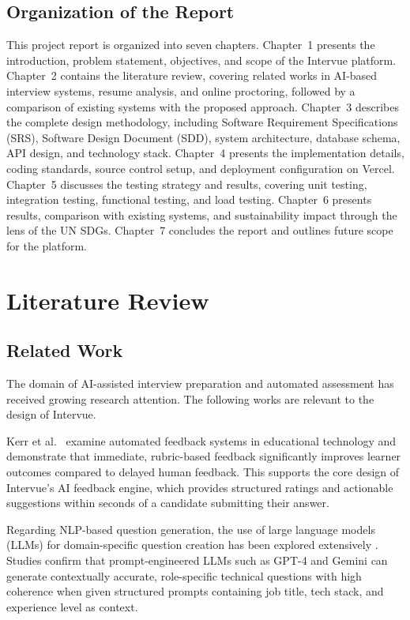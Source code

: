 \documentclass{fisatprojectfinal}
\begin{document}
\section{Organization of the Report}
This project report is organized into seven chapters. Chapter~1 presents the introduction,
problem statement, objectives, and scope of the Intervue platform. Chapter~2 contains the
literature review, covering related works in AI-based interview systems, resume analysis,
and online proctoring, followed by a comparison of existing systems with the proposed
approach. Chapter~3 describes the complete design methodology, including Software Requirement
Specifications (SRS), Software Design Document (SDD), system architecture, database schema,
API design, and technology stack. Chapter~4 presents the implementation details, coding
standards, source control setup, and deployment configuration on Vercel. Chapter~5 discusses
the testing strategy and results, covering unit testing, integration testing, functional
testing, and load testing. Chapter~6 presents results, comparison with existing systems, and
sustainability impact through the lens of the UN SDGs. Chapter~7 concludes the report and
outlines future scope for the platform.

\chapter{Literature Review}

\section{Related Work}
The domain of AI-assisted interview preparation and automated assessment has received growing
research attention. The following works are relevant to the design of Intervue.

Kerr et al.\ \cite{book1} examine automated feedback systems in educational technology and
demonstrate that immediate, rubric-based feedback significantly improves learner outcomes
compared to delayed human feedback. This supports the core design of Intervue's AI feedback
engine, which provides structured ratings and actionable suggestions within seconds of a
candidate submitting their answer.

Regarding NLP-based question generation, the use of large language models (LLMs) for
domain-specific question creation has been explored extensively \cite{article1}. Studies
confirm that prompt-engineered LLMs such as GPT-4 and Gemini can generate contextually
accurate, role-specific technical questions with high coherence when given structured prompts
containing job title, tech stack, and experience level as context.
\end{document}
